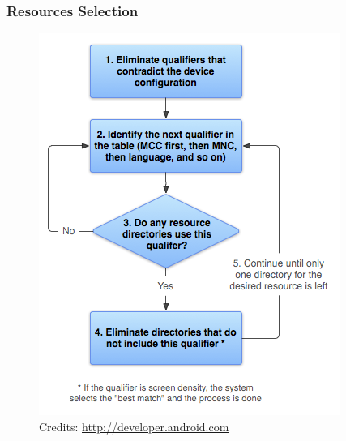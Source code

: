 \begin{frame}
  \frametitle{Resources Selection}
  \begin{figure}[h!]
    \centering
    \includegraphics[height=0.8\textheight]{slides/android-application-resources/resource-selection.png}\\
    {
      \tiny
      Credits: \url{http://developer.android.com}
    }
  \end{figure}
\end{frame}
